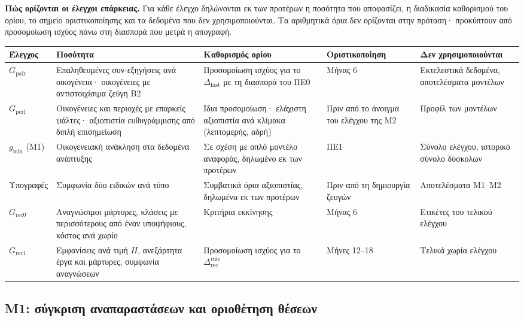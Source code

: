 \documentclass[11pt,a4paper]{article}
\newcommand{\dhist}{\Delta_{\mathrm{hist}}}
\begin{document}
\noindent\textbf{Πώς ορίζονται οι έλεγχοι επάρκειας.} Για κάθε έλεγχο δηλώνονται εκ των προτέρων η ποσότητα που αποφασίζει, η διαδικασία καθορισμού του ορίου, το σημείο οριστικοποίησης και τα δεδομένα που δεν χρησιμοποιούνται. Τα αριθμητικά όρια δεν ορίζονται στην πρόταση· προκύπτουν από προσομοίωση ισχύος πάνω στη διασπορά που μετρά η απογραφή.

\begin{center}\small
\begin{tabularx}{\linewidth}{@{}L{1.7cm}YYL{2.65cm}Y@{}}
\toprule
\textbf{Έλεγχος} & \textbf{Ποσότητα} & \textbf{Καθορισμός ορίου} & \textbf{Οριστικοποίηση} & \textbf{Δεν χρησιμοποιούνται}\\\midrule
$G_{\mathrm{pair}}$ & Επαληθευμένες συν-εξηγήσεις ανά οικογένεια· οικογένειες με αντιστοιχίσιμα ζεύγη B2 & Προσομοίωση ισχύος για το $\dhist$ με τη διασπορά του ΠΕ0 & Μήνας 6 & Εκτελεστικά δεδομένα, αποτελέσματα μοντέλων\\
$G_{\mathrm{perf}}$ & Οικογένειες και περιοχές με επαρκείς ψάλτες· αξιοπιστία ευθυγράμμισης από διπλή επισημείωση & Ίδια προσομοίωση· ελάχιστη αξιοπιστία ανά κλίμακα (λεπτομερής, αδρή) & Πριν από το άνοιγμα του ελέγχου της M2 & Προφίλ των μοντέλων\\
$g_{\min}$ (M1) & Οικογενειακή ανάκληση στα δεδομένα ανάπτυξης & Σε σχέση με απλό μοντέλο αναφοράς, δηλωμένο εκ των προτέρων & ΠΕ1 & Σύνολο ελέγχου, ιστορικό σύνολο δύσκολων\\
Υπογραφές & Συμφωνία δύο ειδικών ανά τύπο & Συμβατικά όρια αξιοπιστίας, δηλωμένα εκ των προτέρων & Πριν από τη δημιουργία ζευγών & Αποτελέσματα M1--M2\\
$G_{\mathrm{rec0}}$ & Αναγνώσιμοι μάρτυρες, κλάσεις με περισσότερους από έναν υποψήφιους, κόστος ανά χωρίο & Κριτήρια εκκίνησης & Μήνας 6 & Ετικέτες του τελικού ελέγχου\\
$G_{\mathrm{rec1}}$ & Εμφανίσεις ανά τιμή $H$, ανεξάρτητα έργα και μάρτυρες, συμφωνία αναγνώσεων & Προσομοίωση ισχύος για το $\Delta^{\mathrm{rule}}_{\mathrm{rec}}$ & Μήνες 12--18 & Τελικά χωρία ελέγχου\\\bottomrule
\end{tabularx}
\end{center}

\subsection{Μ1: σύγκριση αναπαραστάσεων και οριοθέτηση θέσεων}\label{ux3bc1-ux3c3ux3cdux3b3ux3baux3c1ux3b9ux3c3ux3b7-ux3b1ux3bdux3b1ux3c0ux3b1ux3c1ux3b1ux3c3ux3c4ux3acux3c3ux3b5ux3c9ux3bd-ux3baux3b1ux3b9-ux3bfux3c1ux3b9ux3bfux3b8ux3adux3c4ux3b7ux3c3ux3b7-ux3b8ux3adux3c3ux3b5ux3c9ux3bd}
\end{document}

